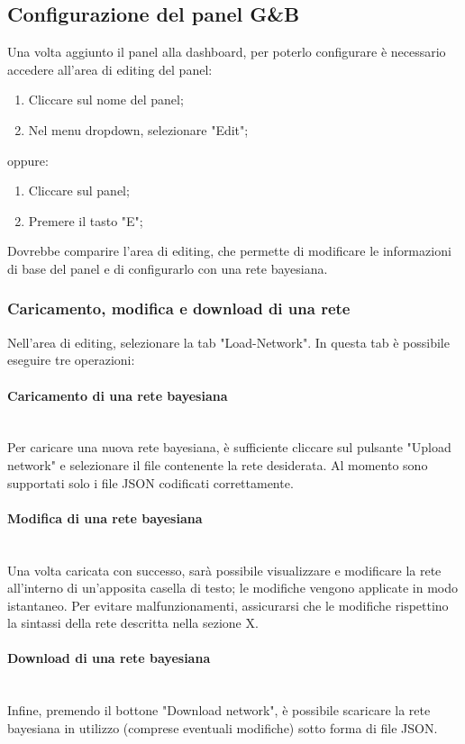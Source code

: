 \subsection{Configurazione del panel G\&B}
Una volta aggiunto il panel alla dashboard, per poterlo configurare è necessario accedere all'area di editing del panel:
\begin{enumerate}
	\item Cliccare sul nome del panel;
	\item Nel menu dropdown, selezionare "Edit";
\end{enumerate}
oppure:
\begin{enumerate}
	\item Cliccare sul panel;
	\item Premere il tasto "E";
\end{enumerate}
Dovrebbe comparire l'area di editing, che permette di modificare le informazioni di base del panel e di configurarlo con una rete bayesiana.

\subsubsection{Caricamento, modifica e download di una rete}
Nell'area di editing, selezionare la tab "Load-Network".
In questa tab è possibile eseguire tre operazioni:
\paragraph{Caricamento di una rete bayesiana}~\\
	Per caricare una nuova rete bayesiana, è sufficiente cliccare sul pulsante "Upload network" e selezionare il file contenente la rete desiderata. Al momento sono supportati solo i file JSON codificati correttamente.
\paragraph{Modifica di una rete bayesiana}~\\
	Una volta caricata con successo, sarà possibile visualizzare e modificare la rete all'interno di un'apposita casella di testo; le modifiche vengono applicate in modo istantaneo. Per evitare malfunzionamenti, assicurarsi che le modifiche rispettino la sintassi della rete descritta nella sezione X.
\paragraph{Download di una rete bayesiana}~\\
	Infine, premendo il bottone "Download network", è possibile scaricare la rete bayesiana in utilizzo (comprese eventuali modifiche) sotto forma di file JSON.